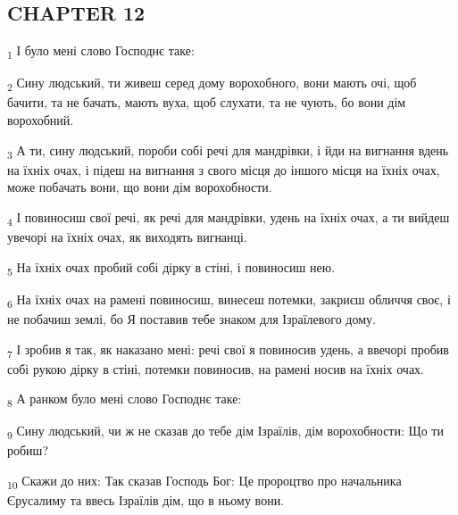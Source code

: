 \subsection{CHAPTER 12}
\begin{tcolorbox}
\textsubscript{1} І було мені слово Господнє таке:
\end{tcolorbox}
\begin{tcolorbox}
\textsubscript{2} Сину людський, ти живеш серед дому ворохобного, вони мають очі, щоб бачити, та не бачать, мають вуха, щоб слухати, та не чують, бо вони дім ворохобний.
\end{tcolorbox}
\begin{tcolorbox}
\textsubscript{3} А ти, сину людський, пороби собі речі для мандрівки, і йди на вигнання вдень на їхніх очах, і підеш на вигнання з свого місця до іншого місця на їхніх очах, може побачать вони, що вони дім ворохобности.
\end{tcolorbox}
\begin{tcolorbox}
\textsubscript{4} І повиносиш свої речі, як речі для мандрівки, удень на їхніх очах, а ти вийдеш увечорі на їхніх очах, як виходять вигнанці.
\end{tcolorbox}
\begin{tcolorbox}
\textsubscript{5} На їхніх очах пробий собі дірку в стіні, і повиносиш нею.
\end{tcolorbox}
\begin{tcolorbox}
\textsubscript{6} На їхніх очах на рамені повиносиш, винесеш потемки, закриєш обличчя своє, і не побачиш землі, бо Я поставив тебе знаком для Ізраїлевого дому.
\end{tcolorbox}
\begin{tcolorbox}
\textsubscript{7} І зробив я так, як наказано мені: речі свої я повиносив удень, а ввечорі пробив собі рукою дірку в стіні, потемки повиносив, на рамені носив на їхніх очах.
\end{tcolorbox}
\begin{tcolorbox}
\textsubscript{8} А ранком було мені слово Господнє таке:
\end{tcolorbox}
\begin{tcolorbox}
\textsubscript{9} Сину людський, чи ж не сказав до тебе дім Ізраїлів, дім ворохобности: Що ти робиш?
\end{tcolorbox}
\begin{tcolorbox}
\textsubscript{10} Скажи до них: Так сказав Господь Бог: Це пророцтво про начальника Єрусалиму та ввесь Ізраїлів дім, що в ньому вони.
\end{tcolorbox}
